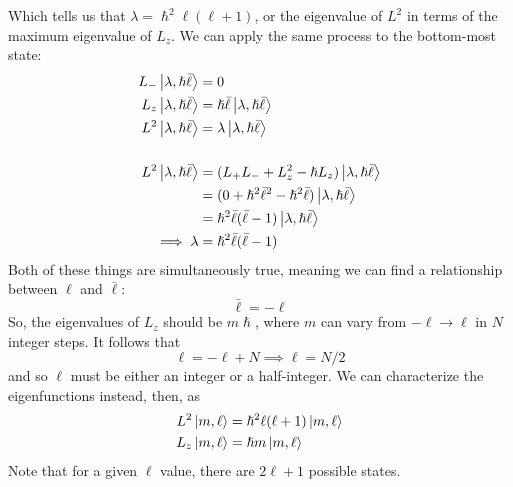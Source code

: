 \documentclass[a4paper]{article}
\begin{document}
Which tells us that $\lambda=\hslash^2\ell(\ell+1)$, or the eigenvalue of
$L^2$ in terms of the maximum eigenvalue of $L_z$. We can apply the same
process to the bottom-most state:
\begin{align*}
	L_-\left\lvert \lambda,\hslash\bar{\ell}\right\rangle&=0\\
	L_z\left\lvert \lambda,\hslash\bar{\ell}\right\rangle&=
		\hslash\bar{\ell}\left\lvert \lambda,\hslash\bar{\ell}\right\rangle\\
	L^2\left\lvert \lambda,\hslash\bar{\ell}\right\rangle&=
		\lambda\left\lvert \lambda,\hslash\bar{\ell}\right\rangle\\~\\
	L^2\left\lvert \lambda,\hslash\bar{\ell}\right\rangle &=
		(L_+ L_- + L_z^2-\hslash L_z)\left\lvert \lambda,\hslash\bar{\ell}\right\rangle\\
		&=(0+\hslash^2\bar{\ell}^2-\hslash^2\bar{\ell})
			\left\lvert \lambda,\hslash\bar{\ell}\right\rangle\\
	&= \hslash^2\bar{\ell}(\bar{\ell}-1)\left\lvert \lambda,\hslash\bar{\ell}\right\rangle\\
	\implies \lambda &= \hslash^2\bar{\ell}(\bar{\ell}-1)
\end{align*}
Both of these things are simultaneously true, meaning we can find a
relationship between $\ell$ and $\bar{\ell}$:
\[ \bar{\ell} = -\ell \]
So, the eigenvalues of $L_z$ should be $m\hslash$, where $m$ can vary from
$-\ell\to\ell$ in $N$ integer steps. It follows that 
\[ \ell=-\ell+N \implies \ell=N/2 \]
and so $\ell$ must be either an integer or a half-integer. We can characterize
the eigenfunctions instead, then, as
\begin{align*}
	L^2\left\lvert m,\ell\right\rangle &= \hslash^2\ell(\ell+1)\left\lvert m,\ell\right\rangle\\
	L_z\left\lvert m,\ell\right\rangle &= \hslash m\left\lvert m,\ell\right\rangle
\end{align*}
Note that for a given $\ell$ value, there are $2\ell+1$ possible states.
\end{document}
